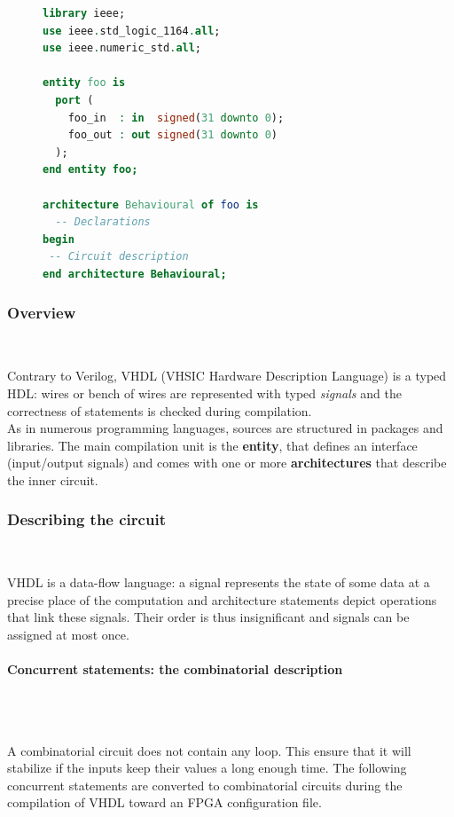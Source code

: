 \documentclass[10pt,a4paper]{article}
\renewcommand{\indent}{~\\\vspace{-.8cm}}
\newcommand{\pindent}{~\\\indent}
\begin{document}
\begin{figure}
	\vspace{-35pt}
\begin{lstlisting}[language=VHDL]
library ieee;
use ieee.std_logic_1164.all;
use ieee.numeric_std.all;
	
entity foo is
  port (
    foo_in  : in  signed(31 downto 0);
    foo_out : out signed(31 downto 0)
  );
end entity foo;
	
architecture Behavioural of foo is
  -- Declarations
begin
 -- Circuit description
end architecture Behavioural;
\end{lstlisting}
\label{VHDL}
\end{figure}

\subsubsection{Overview}\indent

Contrary to Verilog, VHDL (VHSIC Hardware Description Language) is a typed HDL: wires or bench of wires are represented with typed \textit{signals} and the correctness of statements is checked during compilation.\\

As in numerous programming languages, sources are structured in packages and libraries.
The main compilation unit is the \textbf{entity}, that defines an interface (input/output signals) and comes with one or more \textbf{architectures} that describe the inner circuit.


\subsubsection{Describing the circuit} \indent

VHDL is a data-flow language: a signal represents the state of some data at a precise place of the computation and architecture statements depict operations that link these signals. Their order is thus insignificant and signals can be assigned at most once.


\paragraph{Concurrent statements: the combinatorial description} \pindent
\label{Concurr}

A combinatorial circuit does not contain any loop. This ensure that it will stabilize if the inputs keep their values a long enough time. The following concurrent statements are converted to combinatorial circuits during the compilation of VHDL toward an FPGA configuration file.
\end{document}
